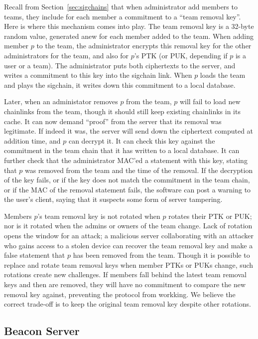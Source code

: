 Recall from Section~\ref{sec:sigchains} that when administrator add members to
teams, they include for each member a commitment to a ``team removal key''. Here
is where this mechanism comes into play. The team removal key is a 32-byte
random value, generated anew for each member added to the team. When adding
member $p$ to the team, the administrator encrypts this removal key for the
other administrators for the team, and also for $p$'s PTK (or PUK, depending if
$p$ is a user or a team). The administrator puts both ciphertexts to the server,
and writes a commitment to this key into the sigchain link. When $p$ loads the 
team and plays the sigchain, it writes down this commitment to a local database.

Later, when an administator removes $p$ from the team, $p$ will fail to load
new chainlinks from the team, though it should still keep existing chainlinks
in its cache. It can now demand ``proof'' from the server that its removal
was legitimate. If indeed it was, the server will send down the ciphertext
computed at addition time, and $p$ can decrypt it. It can check this key
against the commitment in the team chain that it has written to a local database.
It can further check that the administrator MAC'ed a statement with this
key, stating that $p$ was removed from the team and the time of the removal.
If the decryption of the key fails, or if the key does not match the commitment
in the team chain, or if the MAC of the removal statement fails, the software
can post a warning to the user's client, saying that it suspects some form
of server tampering.

Members $p$'s team removal key is not rotated when $p$ rotates their PTK or PUK;
nor is it rotated when the admins or owners of the team change. Lack of rotation
opens the window for an attack; a malicious server collaborating with an
attacker who gains access to a stolen device can recover the team removal key
and make a false statement that $p$ has been removed from the team. Though it is 
possible to replace and rotate team removal keys when member PTKs or PUKs change,
such rotations create new challenges. If members fall behind the latest
team removal keys and then are removed, they will have no commitment to 
compare the new removal key against, preventing the protocol from workking.
We believe the correct trade-off is to keep the original team removal key
despite other rotations.

\subsection{Beacon Server}
\label{sec:beacon}

